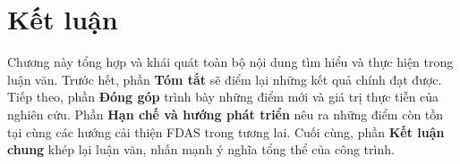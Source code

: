 
\chapter{Kết luận}

Chương này tổng hợp và khái quát toàn bộ nội dung tìm hiểu và thực hiện trong luận văn. 
Trước hết, phần \textbf{Tóm tắt} sẽ điểm lại những kết quả chính đạt được. 
Tiếp theo, phần \textbf{Đóng góp} trình bày những điểm mới và giá trị thực tiễn của nghiên cứu. 
Phần \textbf{Hạn chế và hướng phát triển} nêu ra những điểm còn tồn tại cùng các hướng cải thiện FDAS trong tương lai. 
Cuối cùng, phần \textbf{Kết luận chung} khép lại luận văn, nhấn mạnh ý nghĩa tổng thể của công trình. 





